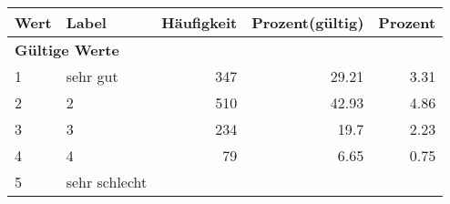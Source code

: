      \begin{longtable}{lXrrr}
     \toprule
     \textbf{Wert} & \textbf{Label} & \textbf{Häufigkeit} & \textbf{Prozent(gültig)} & \textbf{Prozent} \\
     \endhead
     \midrule
     \multicolumn{5}{l}{\textbf{Gültige Werte}}\\

     1 &
     \multicolumn{1}{X}{ sehr gut   } &


       \num{347} &
       \num[round-mode=places,round-precision=2]{29,21} &
         \num[round-mode=places,round-precision=2]{3,31} \\

     2 &
     \multicolumn{1}{X}{ 2   } &


       \num{510} &
       \num[round-mode=places,round-precision=2]{42,93} &
         \num[round-mode=places,round-precision=2]{4,86} \\

     3 &
     \multicolumn{1}{X}{ 3   } &


       \num{234} &
       \num[round-mode=places,round-precision=2]{19,7} &
         \num[round-mode=places,round-precision=2]{2,23} \\

     4 &
     \multicolumn{1}{X}{ 4   } &


       \num{79} &
       \num[round-mode=places,round-precision=2]{6,65} &
         \num[round-mode=places,round-precision=2]{0,75} \\

     5 &
     \multicolumn{1}{X}{ sehr schlecht   } &



\end{longtable}
